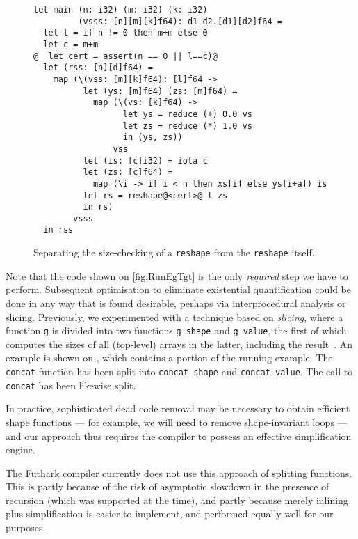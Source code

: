 \begin{figure}
\begin{lstlisting}[xleftmargin=0pt]
let main (n: i32) (m: i32) (k: i32)
         (vsss: [n][m][k]f64): d1 d2.[d1][d2]f64 =
  let l = if n != 0 then m+m else 0
  let c = m+m
@  let cert = assert(n == 0 || l==c)@
  let (rss: [n][d]f64) =
    map (\(vss: [m][k]f64): [l]f64 ->
          let (ys: [m]f64) (zs: [m]f64) =
            map (\(vs: [k]f64) ->
                  let ys = reduce (+) 0.0 vs
                  let zs = reduce (*) 1.0 vs
                  in (ys, zs))
                vss
          let (is: [c]i32) = iota c
          let (zs: [c]f64) =
            map (\i -> if i < n then xs[i] else ys[i+a]) is
          let rs = reshape@<cert>@ l zs
          in rs)
        vsss
  in rss
\end{lstlisting}

  \caption{Separating the size-checking of a \lstinline{reshape} from
    the \lstinline{reshape} itself.}
\label{fig:SimplifyFShapeCert}
\end{figure}

Note that the code shown on \cref{fig:RunEgTgt} is the only
\textit{required} step we have to perform.  Subsequent optimisation to
eliminate existential quantification could be done in any way that is
found desirable, perhaps via interprocedural analysis or slicing.
Previously, we experimented with a technique based on \textit{slicing},
where a function \lstinline{g} is divided into two functions
\lstinline{g_shape} and \lstinline{g_value}, the first of which
computes the sizes of all (top-level) arrays in the latter, including
the result~\cite{henriksen2014size}.  An example is shown on
, which contains a portion of the running
example.  The \lstinline{concat} function has been split into
\lstinline{concat_shape} and \lstinline{concat_value}. The call to
\lstinline{concat} has been likewise split.

In practice, sophisticated dead code removal may be necessary to
obtain efficient shape functions --- for example, we will need to
remove shape-invariant loops --- and our approach thus requires the
compiler to possess an effective simplification engine.

The Futhark compiler currently does not use this approach of splitting
functions.  This is partly because of the risk of asymptotic slowdown
in the presence of recursion (which was supported at the time), and
partly because merely inlining plus simplification is easier to
implement, and performed equally well for our purposes.


